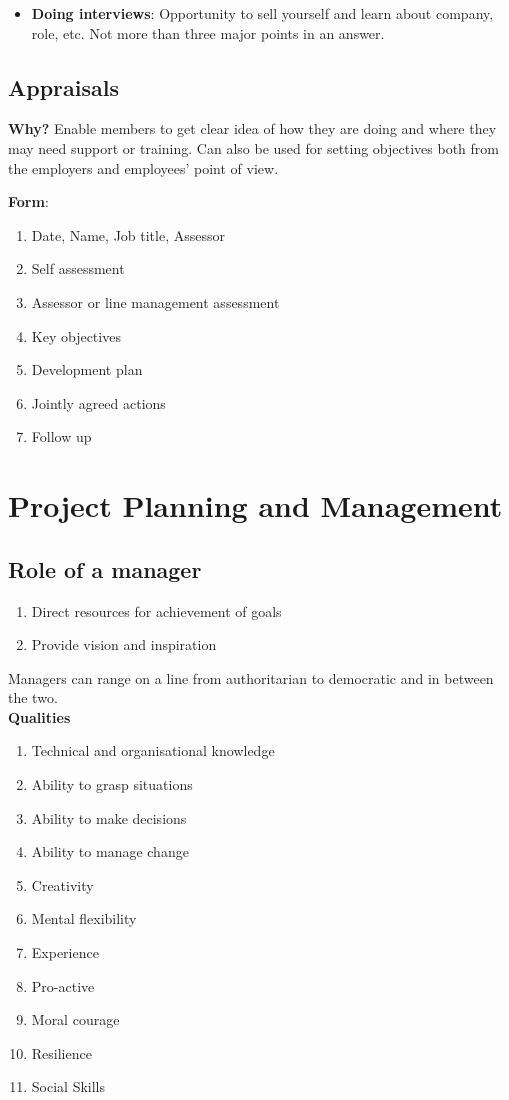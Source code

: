 \documentclass{article}
\begin{document}
\begin{multicols}{2}
\begin{itemize}
    \item \textbf{Doing interviews}: Opportunity to sell yourself and learn about company, role, etc. Not more than three major points in an answer. 
\end{itemize}

\subsection{Appraisals}
\textbf{Why?} Enable members to get clear idea of how they are doing and where they may need support or training. Can also be used for setting objectives both from the employers and employees' point of view.

\textbf{Form}:
\begin{enumerate}
    \item Date, Name, Job title, Assessor
    \item Self assessment
    \item Assessor or line management assessment
    \item Key objectives
    \item Development plan
    \item Jointly agreed actions
    \item Follow up
\end{enumerate}

\section{Project Planning and Management}
\subsection{Role of a manager}
\begin{enumerate}
    \item Direct resources for achievement of goals
    \item Provide vision and inspiration
\end{enumerate}

Managers can range on a line from authoritarian to democratic and in between the two.\\

\textbf{Qualities}
\begin{enumerate}
    \item Technical and organisational knowledge
    \item Ability to grasp situations
    \item Ability to make decisions
    \item Ability to manage change
    \item Creativity
    \item Mental flexibility
    \item Experience
    \item Pro-active
    \item Moral courage
    \item Resilience
    \item Social Skills
\end{enumerate}


\end{multicols}
\end{document}
